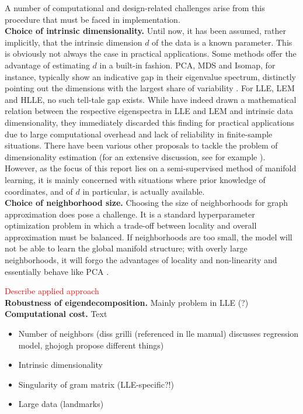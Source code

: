 A number of computational and design-related challenges arise from this 
procedure that must be faced in implementation.
\\

\textbf{Choice of intrinsic dimensionality.} 
Until now, it has been assumed, rather implicitly, that the intrinsic dimension 
$d$ of the data is a known parameter.
This is obviously not always the case in practical applications.
Some methods offer the advantage of estimating $d$ in a built-in fashion. 
PCA, MDS and Isomap, for instance, typically show an indicative gap in their 
eigenvalue spectrum, distinctly pointing out the dimensions with the largest 
share of variability \citep{sauletal2006}.
For LLE, LEM and HLLE, no such tell-tale gap exists.
While \citet{shasaul2005} have indeed drawn a mathematical relation between the 
respective eigenspectra in LLE and LEM and intrinsic data dimensionality, they 
immediately discarded this finding for practical applications due to large 
computational overhead and lack of reliability in finite-sample situations.
There have been various other proposals to tackle the problem of dimensionality 
estimation (for an extensive discussion, see for example 
\citet{disswissel2017}).
However, as the focus of this report lies on a semi-supervised method of 
manifold learning, it is mainly concerned with situations where prior knowledge 
of coordinates, and of $d$ in particular, is actually available.
\\

\textbf{Choice of neighborhood size.} Choosing the size of neighborhoods for 
graph approximation does pose a challenge.
It is a standard hyperparameter optimization problem in which a trade-off 
between locality and overall approximation must be balanced.
If neighborhoods are too small, the model will not be able to learn the global 
manifold structure; with overly large neighborhoods, it will forgo the 
advantages of locality and non-linearity and essentially behave like PCA 
\citep{deridderduin2002}.

\textcolor{red}{Describe applied approach}
\\

\textbf{Robustness of eigendecomposition.} Mainly problem in LLE (?)
\\

\textbf{Computational cost.} Text
\\

\begin{itemize}
  \item Number of neighbors (diss grilli (referenced in lle manual) discusses 
  regression model, ghojogh propose different things)
  \item Intrinsic dimensionality
  \item Singularity of gram matrix (LLE-specific?!)
  \item Large data (landmarks)
\end{itemize}

